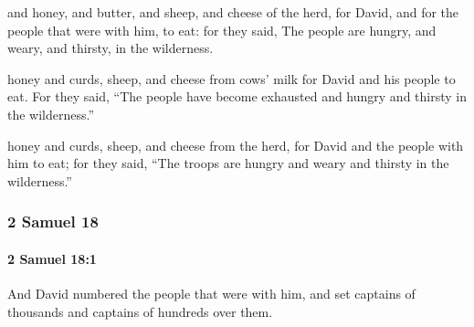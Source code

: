 			\begin{versebox}
					\item[BHS] 
					\item[ASV] and honey, and butter, and sheep, and cheese of the herd, for David, and for the people that were with him, to eat: for they said, The people are hungry, and weary, and thirsty, in the wilderness.
					\item[NIV] honey and curds, sheep, and cheese from cows’ milk for David and his people to eat. For they said, “The people have become exhausted and hungry and thirsty in the wilderness.”
					\item[NRSV] honey and curds, sheep, and cheese from the herd, for David and the people with him to eat; for they said, “The troops are hungry and weary and thirsty in the wilderness.”
			\end{versebox}
	\subsubsection{2 Samuel 18} %
		\label{2SAMUEL-18}

		\paragraph{2 Samuel 18:1} %
			\label{2SAMUEL-18-1}

			And David numbered the people that were with him, and set captains of thousands and captains of hundreds over them.

